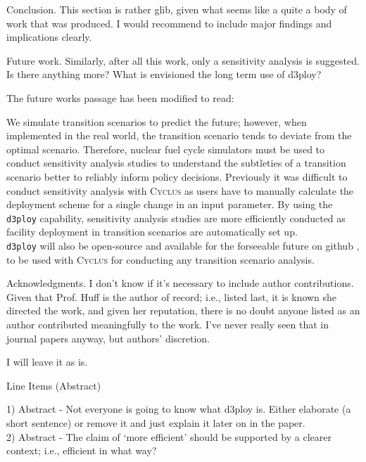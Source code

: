 \documentclass[answers,11pt]{exam}
\newcommand{\Cyclus}{\textsc{Cyclus}\xspace}%
\newcommand{\deploy}{\texttt{d3ploy}\xspace}%
\begin{document}
\begin{questions}
\question Conclusion. This section is rather glib, given what seems like a quite a body of work that was produced.
I would recommend to include major findings and implications clearly.

\begin{solution}
\end{solution}

\question Future work. Similarly, after all this work, only a sensitivity analysis is suggested. Is there anything
more? What is envisioned the long term use of d3ploy?

\begin{solution}
The future works passage has been modified to read: 

We simulate transition scenarios to predict the future; 
however, when implemented in the real world, the transition 
scenario tends to deviate from the optimal scenario.
Therefore, nuclear fuel cycle simulators must be used to conduct
sensitivity analysis studies to understand the subtleties of 
a transition scenario better to reliably inform policy decisions.
Previously it was difficult to conduct sensitivity analysis with \Cyclus 
as users have to manually calculate the deployment scheme for a 
single change in an input parameter. 
By using the \deploy capability,
sensitivity analysis studies are more efficiently 
conducted as facility deployment in transition scenarios 
are automatically set up. \\
\deploy will also be open-source and available for the forseeable future on github 
\cite{noauthor_arfc/d3ploy:_2019}, to be used with \Cyclus for conducting any 
transition scenario analysis. 
\end{solution}

\question Acknowledgments. I don’t know if it’s necessary to include author contributions. Given that Prof. Huff
is the author of record; i.e., listed last, it is known she directed the work, and given her reputation, there
is no doubt anyone listed as an author contributed meaningfully to the work. I’ve never really seen that
in journal papers anyway, but authors’ discretion.

\begin{solution}
        I will leave it as is. 
\end{solution}

\question Line Items (Abstract)

1) Abstract - Not everyone is going to know what d3ploy is. Either elaborate (a short sentence) or
remove it and just explain it later on in the paper. \\
2) Abstract - The claim of ‘more efficient’ should be supported by a clearer context; i.e., efficient in
what way?



\end{questions}
\end{document}
